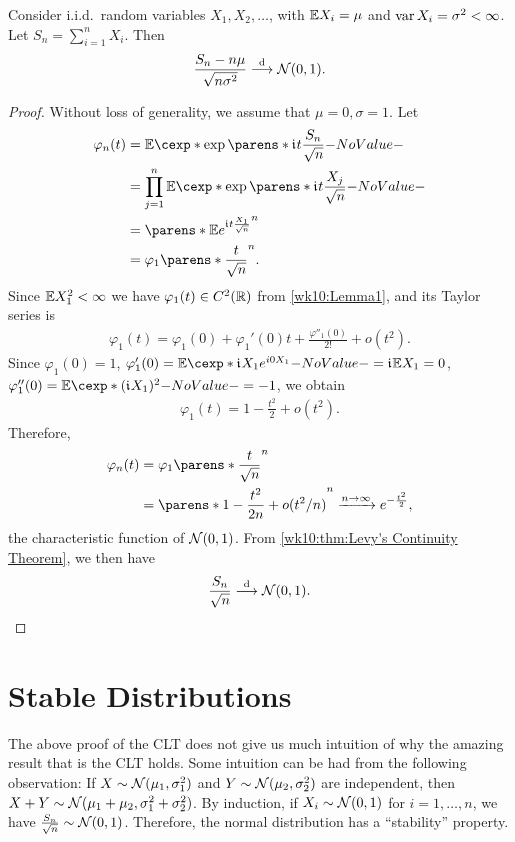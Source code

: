 \documentclass[12pt]{article}
\begin{document}
\begin{Theorem}\label{wk10:thm:CLT_IID}
Consider i.i.d.\ random variables $X_1,X_2,\ldots$, with $\E X_i= \mu$ and $\operatorname{var} X_i=\sigma^2<\infty$. Let $S_n= \sum_{i=1}^n X_i$. Then  
\begin{align}\label{wk10:eq:CLT}
\frac{S_n-n\mu}{\sqrt{n\sigma^2}} \stackrel{\mathrm{d}}{\longrightarrow} \mathcal{N}(0,1).
\end{align}
\end{Theorem}
\begin{proof}
Without loss of generality, we assume that $\mu=0,\sigma=1$. Let
\begin{align*}
\varphi_n(t)
&=\E[\exp\parens*{\iu t\frac{S_n}{\sqrt n}}]	\\
& = \prod_{j=1}^n \E[\exp\parens*{\iu t\frac{X_j}{\sqrt n}}]\\
& =\parens*{\E e^{\iu t\frac{X_1}{\sqrt n}}}^n\\					
& = \varphi_1\parens*{\frac t {\sqrt n}}^n.
\end{align*}
Since $\E X_1^2<\infty$ we have $\varphi_1(t) \in C^2(\mathbb{R})$ from \cref{wk10:Lemma1}, and its Taylor series is
\begin{align*}
\varphi_1(t)=\varphi_1(0)+\varphi_1'(0) t +\frac{\varphi''_1(0)}{2!}+o(t^2). 
\end{align*}
Since $\varphi_1(0)=1$, $\varphi'_1(0)= \E[\iu X_1 e^{i 0 X_1}]=\iu\E X_1=0$, $\varphi''_1(0)= \E[(\iu X_1)^2]=-1$, we obtain
\begin{align*}
\varphi_1(t)=1-\frac{t^2}{2}+o(t^2).
\end{align*}
Therefore,
\begin{align*}
\varphi_n(t)& = \varphi_1\parens*{\frac t {\sqrt n}}^n\\
& = \parens*{1-\frac{t^2}{2n}+o(t^2/n)}^n \xrightarrow{n\to \infty} e^{-\frac{t^2}{2}}, 
\end{align*}
the characteristic function of $\mathcal{N}(0,1)$. From \cref{wk10:thm:Levy's Continuity Theorem}, we then have
\begin{align*}
\frac{S_n}{\sqrt n} \stackrel{\mathrm{d}}{\longrightarrow} \mathcal{N}(0,1).
\end{align*}
\end{proof}

\section{Stable Distributions}

The above proof of the CLT does not give us much intuition of why the amazing result that is the CLT holds. Some intuition can be had from the following observation: If $X \sim \mathcal{N}(\mu_1,\sigma_1^2)$ and $Y \sim \mathcal{N}(\mu_2,\sigma_2^2)$ are independent, then $X+Y \sim \mathcal{N}(\mu_1+\mu_2,\sigma_1^2+\sigma_2^2)$. By induction, if $X_i\sim\mathcal{N}(0,1)$ for $i=1,\ldots,n$, we have $\frac{S_n}{\sqrt n} \sim \mathcal{N}(0,1)$. Therefore, the normal distribution has a ``stability'' property. 
\end{document}
